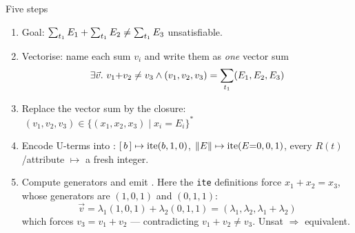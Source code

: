 \documentclass[9pt,aspectratio=169]{beamer}
\begin{document}
\begin{frame}[fragile]{Five steps}
\small
\begin{enumerate}
\item<1-> Goal: $\sum_{t_1}E_1+\sum_{t_1}E_2\neq\sum_{t_1}E_3$ unsatisfiable.
\item<2-> \alert{Vectorise}: name each sum $v_i$ and write them as \emph{one} vector sum
  \[\exists\vec v.\ v_1{+}v_2\neq v_3 \wedge (v_1,v_2,v_3)=\sum_{t_1}(E_1,E_2,E_3)\]
\item<3-> Replace the vector sum by the closure:
  $\ (v_1,v_2,v_3)\in\{(x_1,x_2,x_3)\mid x_i{=}E_i\}^*$
\item<4-> Encode U-terms into \lia{}: $[\,b\,]\mapsto\mathrm{ite}(b,1,0)$,
  $\left\lVert E \right\rVert\mapsto\mathrm{ite}(E{=}0,0,1)$, every $R(t)$/attribute $\mapsto$ a fresh integer.
\item<5-> Compute \alert{generators} and emit \lia{}. Here the \texttt{ite} definitions force
  $x_1{+}x_2=x_3$, whose generators are $(1,0,1)$ and $(0,1,1)$:
  \[\vec v=\lambda_1(1,0,1)+\lambda_2(0,1,1)=(\lambda_1,\lambda_2,\lambda_1{+}\lambda_2)\]
  which forces $v_3=v_1{+}v_2$ --- contradicting $v_1{+}v_2\neq v_3$. \alert{Unsat $\Rightarrow$ equivalent.}
\end{enumerate}
\end{frame}
\end{document}
